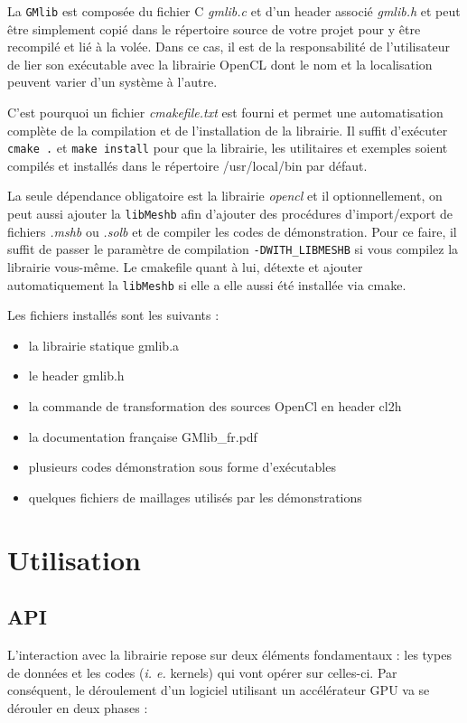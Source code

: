 \documentclass[a4paper,12pt]{article}
\begin{document}
La {\tt GMlib} est composée du fichier C \emph{gmlib.c} et d'un header associé \emph{gmlib.h} et peut être simplement copié dans le répertoire source de votre projet pour y être recompilé et lié à la volée.
Dans ce cas, il est de la responsabilité de l'utilisateur de lier son exécutable avec la librairie OpenCL dont le nom et la localisation peuvent varier d'un système à l'autre.

C'est pourquoi un fichier \emph{cmakefile.txt} est fourni et permet une automatisation complète de la compilation et de l'installation de la librairie.
Il suffit d'exécuter {\tt cmake .} et {\tt make install} pour que la librairie, les utilitaires et exemples soient compilés et installés dans le répertoire /usr/local/bin par défaut.

La seule dépendance obligatoire est la librairie \emph{opencl} et il optionnellement, on peut aussi ajouter la {\tt libMeshb} afin d'ajouter des procédures d'import/export de fichiers \emph{.mshb} ou \emph{.solb} et de compiler les codes de démonstration.
Pour ce faire, il suffit de passer le paramètre de compilation {\tt -DWITH\_LIBMESHB} si vous compilez la librairie vous-même.
Le cmakefile quant à lui, détexte et ajouter automatiquement la {\tt libMeshb} si elle a elle aussi été installée via cmake.

Les fichiers installés sont les suivants :

\begin{itemize}
   \item la librairie statique gmlib.a
   \item le header gmlib.h
   \item la commande de transformation des sources OpenCl en header cl2h
   \item la documentation française GMlib\_fr.pdf
   \item plusieurs codes démonstration sous forme d'exécutables
   \item quelques fichiers de maillages utilisés par les démonstrations
\end{itemize}


%
%

\section{Utilisation}

\subsection{API}
\label{sec:API}
L'interaction avec la librairie repose sur deux éléments fondamentaux : les types de données et les codes (\emph{i. e.} kernels) qui vont opérer sur celles-ci. Par conséquent, le déroulement d'un logiciel utilisant un accélérateur GPU va se dérouler en deux phases :
\end{document}
